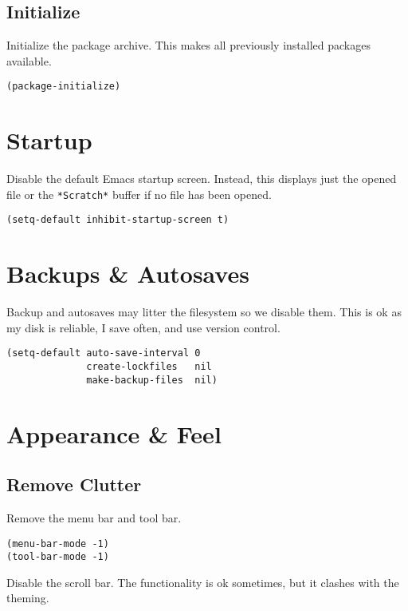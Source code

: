 \documentclass[11pt]{article}
\begin{document}
\subsection{Initialize}
\label{sec:org935957a}

Initialize the package archive. This makes all previously installed packages available.

\begin{verbatim}
(package-initialize)
\end{verbatim}
\section{Startup}
\label{sec:orga71e986}

Disable the default Emacs startup screen. Instead, this displays just the opened
file or the \texttt{*Scratch*} buffer if no file has been opened.

\begin{verbatim}
(setq-default inhibit-startup-screen t)
\end{verbatim}
\section{Backups \& Autosaves}
\label{sec:orgd048df1}

Backup and autosaves may litter the filesystem so we disable
them. This is ok as my disk is reliable, I save often, and use version
control.

\begin{verbatim}
(setq-default auto-save-interval 0
              create-lockfiles   nil
              make-backup-files  nil)
\end{verbatim}
\section{Appearance \& Feel}
\label{sec:orgce748b4}

\subsection{Remove Clutter}
\label{sec:org5785da4}

Remove the menu bar and tool bar.

\begin{verbatim}
(menu-bar-mode -1)
(tool-bar-mode -1)
\end{verbatim}

Disable the scroll bar. The functionality is ok sometimes, but it clashes with
the theming.
\end{document}
